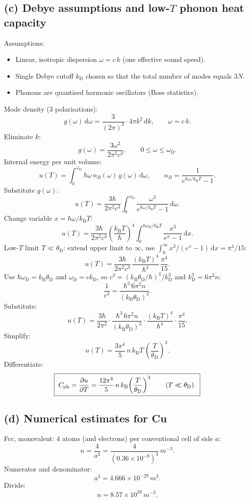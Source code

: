 \documentclass[11pt]{article}
\newcommand{\de}{\mathrm{d}}
\newcommand{\kB}{k_{\mathrm{B}}}
\newcommand{\TD}{\theta_{\mathrm{D}}}
\newcommand{\kD}{k_{\mathrm{D}}}
\newcommand{\omD}{\omega_{\mathrm{D}}}
\begin{document}
\subsection*{(c) Debye assumptions and low-$T$ phonon heat capacity}

Assumptions:
\begin{itemize}\setlength\itemsep{0pt}
\item Linear, isotropic dispersion $\omega = c\,k$ (one effective sound speed).
\item Single Debye cutoff $\kD$ chosen so that the total number of modes equals $3N$.
\item Phonons are quantised harmonic oscillators (Bose statistics).
\end{itemize}

Mode density (3 polarisations):
\[
g(\omega)\,\de\omega = \frac{3}{(2\pi)^{3}}\cdot 4\pi k^{2}\,\de k,\qquad \omega = c\,k.
\]
Eliminate $k$:
\[
g(\omega) = \frac{3\omega^{2}}{2\pi^{2} c^{3}},\qquad 0\le\omega\le\omD.
\]
Internal energy per unit volume:
\[
u(T) = \int_{0}^{\omD}\!\hbar\omega\,n_{B}(\omega)\,g(\omega)\,\de\omega,\qquad n_{B}=\frac{1}{e^{\hbar\omega/\kB T}-1}.
\]
Substitute $g(\omega)$:
\[
u(T) = \frac{3\hbar}{2\pi^{2} c^{3}}\int_{0}^{\omD}\!\frac{\omega^{3}}{e^{\hbar\omega/\kB T}-1}\,\de\omega.
\]
Change variable $x=\hbar\omega/\kB T$:
\[
u(T) = \frac{3\hbar}{2\pi^{2} c^{3}}\!\left(\frac{\kB T}{\hbar}\right)^{4}\!\int_{0}^{\hbar\omD/\kB T}\!\frac{x^{3}}{e^{x}-1}\,\de x.
\]
Low-$T$ limit $T\ll\TD$: extend upper limit to $\infty$, use $\int_{0}^{\infty}\!x^{3}/(e^{x}-1)\,\de x = \pi^{4}/15$:
\[
u(T) = \frac{3\hbar}{2\pi^{2} c^{3}}\,\frac{(\kB T)^{4}}{\hbar^{4}}\,\frac{\pi^{4}}{15}.
\]
Use $\hbar\omD = \kB\TD$ and $\omD = c\kD$, so $c^{3} = (\kB\TD/\hbar)^{3}/\kD^{3}$ and $\kD^{3}=6\pi^{2} n$:
\[
\frac{1}{c^{3}} = \frac{\hbar^{3}\,6\pi^{2} n}{(\kB\TD)^{3}}.
\]
Substitute:
\[
u(T) = \frac{3\hbar}{2\pi^{2}}\cdot\frac{\hbar^{3}\,6\pi^{2} n}{(\kB\TD)^{3}}\cdot\frac{(\kB T)^{4}}{\hbar^{4}}\cdot\frac{\pi^{4}}{15}.
\]
Simplify:
\[
u(T) = \frac{3\pi^{4}}{5}\,n\,\kB T\,\!\left(\frac{T}{\TD}\right)^{3}.
\]
Differentiate:
\[
\boxed{\;C_{\mathrm{ph}} = \pdv{u}{T} = \frac{12\pi^{4}}{5}\,n\,\kB\!\left(\frac{T}{\TD}\right)^{3}\qquad (T\ll\TD).\;}
\]

\subsection*{(d) Numerical estimates for Cu}

Fcc, monovalent: $4$ atoms (and electrons) per conventional cell of side $a$:
\[
n = \frac{4}{a^{3}} = \frac{4}{(0.36\times 10^{-9})^{3}}\,\si{m^{-3}}.
\]
Numerator and denominator:
\[
a^{3} = 4.666\times 10^{-29}\,\si{m^{3}}.
\]
Divide:
\[
n = 8.57\times 10^{28}\,\si{m^{-3}}.
\]
\end{document}
